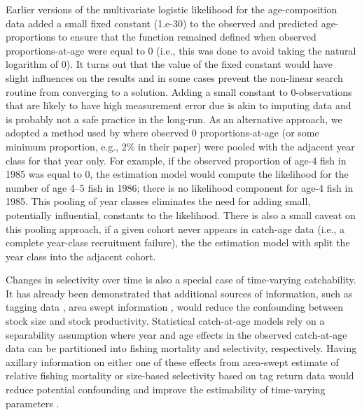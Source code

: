 Earlier versions of the multivariate logistic likelihood for the age-composition data added a small fixed constant (1.e-30) to the observed and predicted age-proportions to ensure that the function remained defined when observed proportions-at-age were equal to 0 (i.e., this was done to avoid taking the natural logarithm of 0).  It turns out that the value of the fixed constant would have slight influences on the results and in some cases prevent the non-linear search routine from converging to a solution.  Adding a small constant to 0-observations that are likely to have high measurement error due is akin to imputing data and is probably not a safe practice in the long-run.  As an alternative approach, we adopted a method used by \cite{richards1997visualizing} where observed 0 proportions-at-age (or some minimum proportion, e.g., 2\% in their paper) were pooled with the adjacent year class for that year only.  For example, if the observed proportion of age-4 fish in 1985 was equal to 0, the estimation model would compute the likelihood for the number of age 4--5 fish in 1986;  there is no likelihood component for age-4 fish in 1985.  This pooling of year classes eliminates the need for adding small, potentially influential, constants to the likelihood. There is also a small caveat on this pooling approach, if a given cohort never appears in catch-age data (i.e., a complete year-class recruitment failure), the the estimation model with split the year class into the adjacent cohort.  

Changes in selectivity over time is also a special case of time-varying catchability.  It has already been demonstrated that additional sources of information, such as tagging data \citep{martell2002implementing}, area swept information \cite{winters1985interaction}, would reduce the confounding between stock size and stock productivity.  Statistical catch-at-age models rely on a separability assumption where year and age effects in the observed catch-at-age data can be partitioned into fishing mortality and selectivity, respectively.  Having axillary information on either one of these effects from area-swept estimate of relative fishing mortality or size-based selectivity based on tag return data would reduce potential confounding and improve the estimability of time-varying parameters \citep[e.g.,][]{sinclair2002disentangling}.

